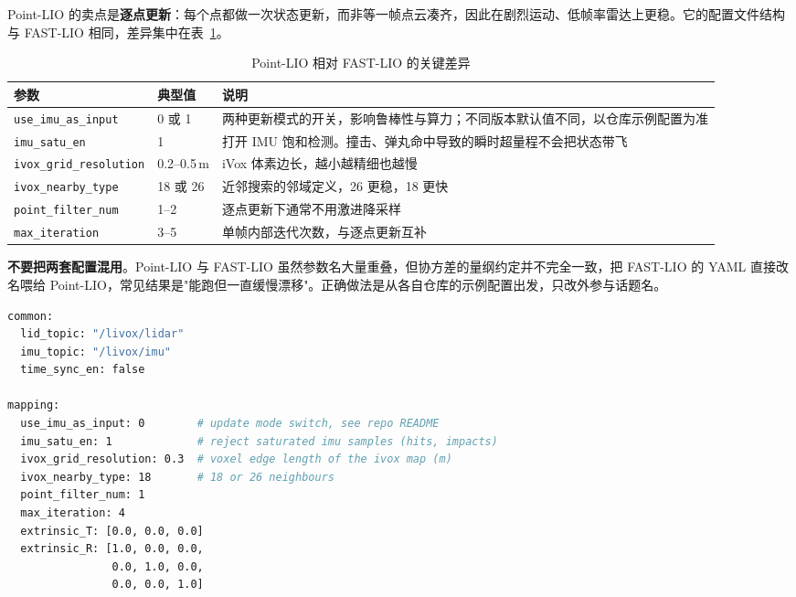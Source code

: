 Point-LIO 的卖点是\textbf{逐点更新}：每个点都做一次状态更新，而非等一帧点云凑齐，因此在剧烈运动、低帧率雷达上更稳\cite{he2023pointlio}。它的配置文件结构与 FAST-LIO 相同，差异集中在表~\ref{tab:27-pointlio}。

\begin{table}[htbp]
  \centering
  \caption{Point-LIO 相对 FAST-LIO 的关键差异}\label{tab:27-pointlio}
  \small
  \begin{tabular}{p{3.4cm}p{2.4cm}p{6.4cm}}
    \toprule
    参数 & 典型值 & 说明 \\
    \midrule
    \lstinline{use_imu_as_input} & 0 或 1 & 两种更新模式的开关，影响鲁棒性与算力；不同版本默认值不同，以仓库示例配置为准 \\
    \lstinline{imu_satu_en} & 1 & 打开 IMU 饱和检测。撞击、弹丸命中导致的瞬时超量程不会把状态带飞 \\
    \lstinline{ivox_grid_resolution} & 0.2--0.5\,m & iVox 体素边长，越小越精细也越慢 \\
    \lstinline{ivox_nearby_type} & 18 或 26 & 近邻搜索的邻域定义，26 更稳，18 更快 \\
    \lstinline{point_filter_num} & 1--2 & 逐点更新下通常不用激进降采样 \\
    \lstinline{max_iteration} & 3--5 & 单帧内部迭代次数，与逐点更新互补 \\
    \bottomrule
  \end{tabular}
\end{table}

\begin{note}
\textbf{不要把两套配置混用}。Point-LIO 与 FAST-LIO 虽然参数名大量重叠，但协方差的量纲约定并不完全一致，把 FAST-LIO 的 YAML 直接改名喂给 Point-LIO，常见结果是"能跑但一直缓慢漂移"。正确做法是从各自仓库的示例配置出发，只改外参与话题名。
\end{note}

\begin{lstlisting}[language=bash,caption={Point-LIO 关键配置（只列与 FAST-LIO 的差异项）},label={lst:27-pointlio}]
common:
  lid_topic: "/livox/lidar"
  imu_topic: "/livox/imu"
  time_sync_en: false

mapping:
  use_imu_as_input: 0        # update mode switch, see repo README
  imu_satu_en: 1             # reject saturated imu samples (hits, impacts)
  ivox_grid_resolution: 0.3  # voxel edge length of the ivox map (m)
  ivox_nearby_type: 18       # 18 or 26 neighbours
  point_filter_num: 1
  max_iteration: 4
  extrinsic_T: [0.0, 0.0, 0.0]
  extrinsic_R: [1.0, 0.0, 0.0,
                0.0, 1.0, 0.0,
                0.0, 0.0, 1.0]
\end{lstlisting}

